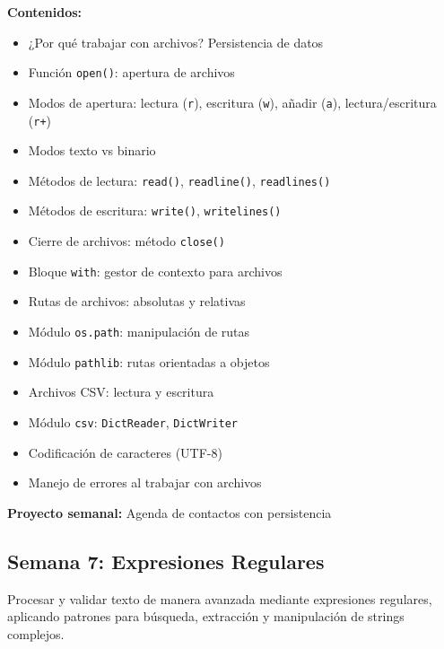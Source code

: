 \documentclass[12pt,letterpaper]{article}
\begin{document}
\textbf{Contenidos:}
\begin{itemize}[leftmargin=*]
    \item ¿Por qué trabajar con archivos? Persistencia de datos
    \item Función \texttt{open()}: apertura de archivos
    \item Modos de apertura: lectura (\texttt{r}), escritura (\texttt{w}), añadir (\texttt{a}), lectura/escritura (\texttt{r+})
    \item Modos texto vs binario
    \item Métodos de lectura: \texttt{read()}, \texttt{readline()}, \texttt{readlines()}
    \item Métodos de escritura: \texttt{write()}, \texttt{writelines()}
    \item Cierre de archivos: método \texttt{close()}
    \item Bloque \texttt{with}: gestor de contexto para archivos
    \item Rutas de archivos: absolutas y relativas
    \item Módulo \texttt{os.path}: manipulación de rutas
    \item Módulo \texttt{pathlib}: rutas orientadas a objetos
    \item Archivos CSV: lectura y escritura
    \item Módulo \texttt{csv}: \texttt{DictReader}, \texttt{DictWriter}
    \item Codificación de caracteres (UTF-8)
    \item Manejo de errores al trabajar con archivos
\end{itemize}

\textbf{Proyecto semanal:} Agenda de contactos con persistencia

\subsection{Semana 7: Expresiones Regulares}

\begin{objetivobox}
Procesar y validar texto de manera avanzada mediante expresiones regulares, aplicando patrones para búsqueda, extracción y manipulación de strings complejos.
\end{objetivobox}
\end{document}
